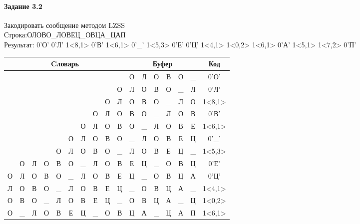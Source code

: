 \documentclass[a4paper, 12pt]{article}
\begin{document}
\paragraph{Задание 3.2}

Закодировать сообщение методом LZSS\\
Строка:ОЛОВО\_ЛОВЕЦ\_ОВЦА\_ЦАП\\
Результат: 0'О' 0'Л' 1<8,1> 0'В' 1<6,1> 0'\_' 1<5,3> 0'Е' 0'Ц' 1<4,1> 1<0,2> 1<6,1> 0'А' 1<5,1> 1<7,2> 0'П'\\
\begin{table}[h!]
\centering
\begin{tabular}{|c|c|c|c|c|c|c|c|c|c|c|c|c|c|c|c|c|}
\hline
\multicolumn{10}{|c|}{Cловарь} & \multicolumn{6}{c|}{Буфер} & Код  \\ \hline
  &   &   &   &   &   &   &   &   &   & О & Л & О & В & О & \_ & 0'О'\\ \hline
  &   &   &   &   &   &   &   &   & О & Л & О & В & О & \_ & Л & 0'Л'\\ \hline
  &   &   &   &   &   &   &   & \cellcolor[HTML]{FFFF00} О & Л & \cellcolor[HTML]{FFFF00} О & В & О & \_ & Л & О & 1<8,1>\\ \hline
  &   &   &   &   &   &   & О & Л & О & В & О & \_ & Л & О & В & 0'В'\\ \hline
  &   &   &   &   &   & \cellcolor[HTML]{FFFF00} О & Л & О & В & \cellcolor[HTML]{FFFF00} О & \_ & Л & О & В & Е & 1<6,1>\\ \hline
  &   &   &   &   & О & Л & О & В & О & \_ & Л & О & В & Е & Ц & 0'\_'\\ \hline
  &   &   &   & О & \cellcolor[HTML]{FFFF00} Л & \cellcolor[HTML]{FFFF00} О & \cellcolor[HTML]{FFFF00} В & О & \_ & \cellcolor[HTML]{FFFF00} Л & \cellcolor[HTML]{FFFF00} О & \cellcolor[HTML]{FFFF00} В & Е & Ц & \_ & 1<5,3>\\ \hline
  & О & Л & О & В & О & \_ & Л & О & В & Е & Ц & \_ & О & В & Ц & 0'Е'\\ \hline
О & Л & О & В & О & \_ & Л & О & В & Е & Ц & \_ & О & В & Ц & А & 0'Ц'\\ \hline
Л & О & В & О & \cellcolor[HTML]{FFFF00} \_ & Л & О & В & Е & Ц & \cellcolor[HTML]{FFFF00} \_ & О & В & Ц & А & \_ & 1<4,1>\\ \hline
\cellcolor[HTML]{FFFF00} О & \cellcolor[HTML]{FFFF00} В & О & \_ & Л & О & В & Е & Ц & \_ & \cellcolor[HTML]{FFFF00} О & \cellcolor[HTML]{FFFF00} В & Ц & А & \_ & Ц & 1<0,2>\\ \hline
О & \_ & Л & О & В & Е & \cellcolor[HTML]{FFFF00} Ц & \_ & О & В & \cellcolor[HTML]{FFFF00} Ц & А & \_ & Ц & А & П & 1<6,1>\\ \hline

\end{tabular}
\end{table}
\end{document}

